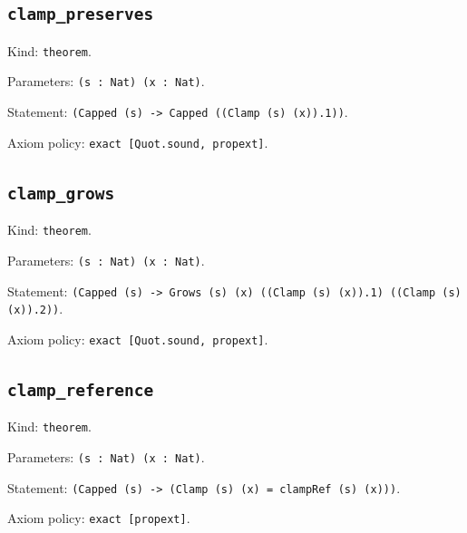 \documentclass[11pt]{article}
\begin{document}
\subsection*{\texttt{clamp\_preserves}}
\noindent Kind: \texttt{theorem}.\par
\noindent Parameters: \texttt{(s : Nat) (x : Nat)}.\par
\noindent Statement: \texttt{(Capped (s) -> Capped ((Clamp (s) (x)).1))}.\par
\noindent Axiom policy: \texttt{exact [Quot.sound, propext]}.\par
\subsection*{\texttt{clamp\_grows}}
\noindent Kind: \texttt{theorem}.\par
\noindent Parameters: \texttt{(s : Nat) (x : Nat)}.\par
\noindent Statement: \texttt{(Capped (s) -> Grows (s) (x) ((Clamp (s) (x)).1) ((Clamp (s) (x)).2))}.\par
\noindent Axiom policy: \texttt{exact [Quot.sound, propext]}.\par
\subsection*{\texttt{clamp\_reference}}
\noindent Kind: \texttt{theorem}.\par
\noindent Parameters: \texttt{(s : Nat) (x : Nat)}.\par
\noindent Statement: \texttt{(Capped (s) -> (Clamp (s) (x) = clampRef (s) (x)))}.\par
\noindent Axiom policy: \texttt{exact [propext]}.\par
\end{document}
